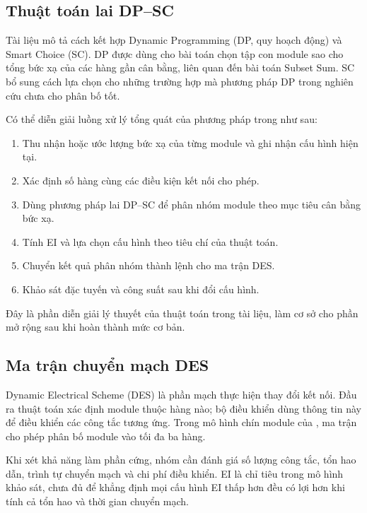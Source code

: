 \subsection{Thuật toán lai DP--SC}

Tài liệu \cite{thanh} mô tả cách kết hợp Dynamic Programming (DP, quy hoạch động) và Smart Choice (SC). DP được dùng cho bài toán chọn tập con module sao cho tổng bức xạ của các hàng gần cân bằng, liên quan đến bài toán Subset Sum. SC bổ sung cách lựa chọn cho những trường hợp mà phương pháp DP trong nghiên cứu chưa cho phân bố tốt.

Có thể diễn giải luồng xử lý tổng quát của phương pháp trong \cite{thanh} như sau:

\begin{enumerate}
    \item Thu nhận hoặc ước lượng bức xạ của từng module và ghi nhận cấu hình hiện tại.
    \item Xác định số hàng cùng các điều kiện kết nối cho phép.
    \item Dùng phương pháp lai DP--SC để phân nhóm module theo mục tiêu cân bằng bức xạ.
    \item Tính EI và lựa chọn cấu hình theo tiêu chí của thuật toán.
    \item Chuyển kết quả phân nhóm thành lệnh cho ma trận DES.
    \item Khảo sát đặc tuyến và công suất sau khi đổi cấu hình.
\end{enumerate}

Đây là phần diễn giải lý thuyết của thuật toán trong tài liệu, làm cơ sở cho phần mở rộng sau khi hoàn thành mức cơ bản.

\subsection{Ma trận chuyển mạch DES}

Dynamic Electrical Scheme (DES) là phần mạch thực hiện thay đổi kết nối. Đầu ra thuật toán xác định module thuộc hàng nào; bộ điều khiển dùng thông tin này để điều khiển các công tắc tương ứng. Trong mô hình chín module của \cite{thanh}, ma trận cho phép phân bố module vào tối đa ba hàng.

Khi xét khả năng làm phần cứng, nhóm cần đánh giá số lượng công tắc, tổn hao dẫn, trình tự chuyển mạch và chi phí điều khiển. EI là chỉ tiêu trong mô hình khảo sát, chưa đủ để khẳng định mọi cấu hình EI thấp hơn đều có lợi hơn khi tính cả tổn hao và thời gian chuyển mạch.

